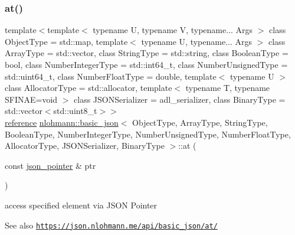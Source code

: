 \subsubsection{\texorpdfstring{at()}{at()}\hspace{0.1cm}{\footnotesize\ttfamily [5/6]}}
{\footnotesize\ttfamily template$<$template$<$ typename U, typename V, typename... Args $>$ class Object\+Type = std\+::map, template$<$ typename U, typename... Args $>$ class Array\+Type = std\+::vector, class String\+Type  = std\+::string, class Boolean\+Type  = bool, class Number\+Integer\+Type  = std\+::int64\+\_\+t, class Number\+Unsigned\+Type  = std\+::uint64\+\_\+t, class Number\+Float\+Type  = double, template$<$ typename U $>$ class Allocator\+Type = std\+::allocator, template$<$ typename T, typename S\+F\+I\+N\+A\+E=void $>$ class J\+S\+O\+N\+Serializer = adl\+\_\+serializer, class Binary\+Type  = std\+::vector$<$std\+::uint8\+\_\+t$>$$>$ \\
\hyperlink{classnlohmann_1_1basic__json_a220ae98554a76205fb7f8822d36b2d5a}{reference} \hyperlink{classnlohmann_1_1basic__json}{nlohmann\+::basic\+\_\+json}$<$ Object\+Type, Array\+Type, String\+Type, Boolean\+Type, Number\+Integer\+Type, Number\+Unsigned\+Type, Number\+Float\+Type, Allocator\+Type, J\+S\+O\+N\+Serializer, Binary\+Type $>$\+::at (\begin{DoxyParamCaption}\item[{const \hyperlink{classnlohmann_1_1basic__json_aa8f1f93b32da01b42413643be32b2c27}{json\+\_\+pointer} \&}]{ptr }\end{DoxyParamCaption})\hspace{0.3cm}{\ttfamily [inline]}}



access specified element via J\+S\+ON Pointer 

\begin{DoxySeeAlso}{See also}
\href{https://json.nlohmann.me/api/basic_json/at/}{\tt https\+://json.\+nlohmann.\+me/api/basic\+\_\+json/at/} 
\end{DoxySeeAlso}
\mbox{\label{classnlohmann_1_1basic__json_a8284b9c1d4d0830151eaa000f907b2e6}} 
